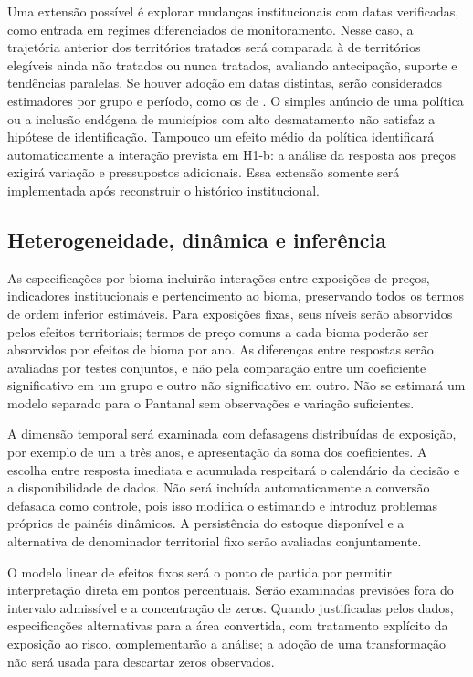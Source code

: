 Uma extensão possível é explorar mudanças institucionais com datas verificadas, como entrada em regimes diferenciados de monitoramento. Nesse caso, a trajetória anterior dos territórios tratados será comparada à de territórios elegíveis ainda não tratados ou nunca tratados, avaliando antecipação, suporte e tendências paralelas. Se houver adoção em datas distintas, serão considerados estimadores por grupo e período, como os de . O simples anúncio de uma política ou a inclusão endógena de municípios com alto desmatamento não satisfaz a hipótese de identificação. Tampouco um efeito médio da política identificará automaticamente a interação prevista em H1-b: a análise da resposta aos preços exigirá variação e pressupostos adicionais. Essa extensão somente será implementada após reconstruir o histórico institucional.

\subsection{Heterogeneidade, dinâmica e inferência}

As especificações por bioma incluirão interações entre exposições de preços, indicadores institucionais e pertencimento ao bioma, preservando todos os termos de ordem inferior estimáveis. Para exposições fixas, seus níveis serão absorvidos pelos efeitos territoriais; termos de preço comuns a cada bioma poderão ser absorvidos por efeitos de bioma por ano. As diferenças entre respostas serão avaliadas por testes conjuntos, e não pela comparação entre um coeficiente significativo em um grupo e outro não significativo em outro. Não se estimará um modelo separado para o Pantanal sem observações e variação suficientes.

A dimensão temporal será examinada com defasagens distribuídas de exposição, por exemplo de um a três anos, e apresentação da soma dos coeficientes. A escolha entre resposta imediata e acumulada respeitará o calendário da decisão e a disponibilidade de dados. Não será incluída automaticamente a conversão defasada como controle, pois isso modifica o estimando e introduz problemas próprios de painéis dinâmicos. A persistência do estoque disponível e a alternativa de denominador territorial fixo serão avaliadas conjuntamente.

O modelo linear de efeitos fixos será o ponto de partida por permitir interpretação direta em pontos percentuais. Serão examinadas previsões fora do intervalo admissível e a concentração de zeros. Quando justificadas pelos dados, especificações alternativas para a área convertida, com tratamento explícito da exposição ao risco, complementarão a análise; a adoção de uma transformação não será usada para descartar zeros observados.

